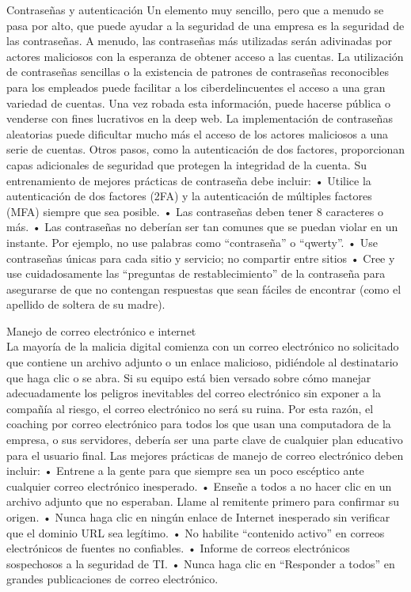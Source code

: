 \documentclass[
]{article}
\begin{document}
Contraseñas y autenticación
Un elemento muy sencillo, pero que a menudo se pasa por alto, que puede ayudar a la seguridad de una empresa es la seguridad de las contraseñas. A menudo, las contraseñas más utilizadas serán adivinadas por actores maliciosos con la esperanza de obtener acceso a las cuentas. La utilización de contraseñas sencillas o la existencia de patrones de contraseñas reconocibles para los empleados puede facilitar a los ciberdelincuentes el acceso a una gran variedad de cuentas. Una vez robada esta información, puede hacerse pública o venderse con fines lucrativos en la deep web.
La implementación de contraseñas aleatorias puede dificultar mucho más el acceso de los actores maliciosos a una serie de cuentas. Otros pasos, como la autenticación de dos factores, proporcionan capas adicionales de seguridad que protegen la integridad de la cuenta.
Su entrenamiento de mejores prácticas de contraseña debe incluir:
• Utilice la autenticación de dos factores (2FA) y la autenticación de múltiples factores (MFA) siempre que sea posible.
• Las contraseñas deben tener 8 caracteres o más.
• Las contraseñas no deberían ser tan comunes que se puedan violar en un instante. Por ejemplo, no use palabras como ``contraseña'' o ``qwerty''.
• Use contraseñas únicas para cada sitio y servicio; no compartir entre sitios
• Cree y use cuidadosamente las ``preguntas de restablecimiento'' de la contraseña para asegurarse de que no contengan respuestas que sean fáciles de encontrar (como el apellido de soltera de su madre).

Manejo de correo electrónico e internet\\
La mayoría de la malicia digital comienza con un correo electrónico no solicitado que contiene un archivo adjunto o un enlace malicioso, pidiéndole al destinatario que haga clic o se abra. Si su equipo está bien versado sobre cómo manejar adecuadamente los peligros inevitables del correo electrónico sin exponer a la compañía al riesgo, el correo electrónico no será su ruina. Por esta razón, el coaching por correo electrónico para todos los que usan una computadora de la empresa, o sus servidores, debería ser una parte clave de cualquier plan educativo para el usuario final.
Las mejores prácticas de manejo de correo electrónico deben incluir:
• Entrene a la gente para que siempre sea un poco escéptico ante cualquier correo electrónico inesperado.
• Enseñe a todos a no hacer clic en un archivo adjunto que no esperaban. Llame al remitente primero para confirmar su origen.
• Nunca haga clic en ningún enlace de Internet inesperado sin verificar que el dominio URL sea legítimo.
• No habilite ``contenido activo'' en correos electrónicos de fuentes no confiables.
• Informe de correos electrónicos sospechosos a la seguridad de TI.
• Nunca haga clic en ``Responder a todos'' en grandes publicaciones de correo electrónico.
\end{document}
